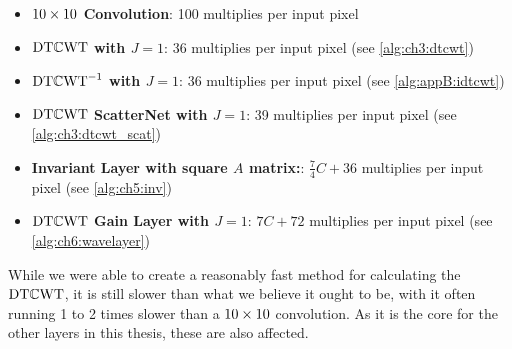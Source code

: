 \pagebreak
\begin{itemize}
  \item \textbf{$10\times10$ Convolution}: 100 multiplies per input pixel
  \item \textbf{$\mathrm{DT}\mathbb{C}\mathrm{WT}$ with $J=1$}: 36 multiplies per input pixel (see \autoref{alg:ch3:dtcwt})
  \item \textbf{$\mathrm{DT}\mathbb{C}\mathrm{WT}^{-1}$ with $J=1$}: 36 multiplies per input pixel (see \autoref{alg:appB:idtcwt}) 
  \item \textbf{$\mathrm{DT}\mathbb{C}\mathrm{WT}$ ScatterNet with $J=1$}: 39 multiplies per input pixel (see \autoref{alg:ch3:dtcwt_scat})
  \item \textbf{Invariant Layer with square $A$ matrix:}: $\frac{7}{4}C + 36$ multiplies per input pixel (see \autoref{alg:ch5:inv})
  \item \textbf{$\mathrm{DT}\mathbb{C}\mathrm{WT}$ Gain Layer with $J=1$}: $7C + 72$ multiplies per input pixel  (see \autoref{alg:ch6:wavelayer})
\end{itemize}

While we were able to create a reasonably fast method for calculating the $\mathrm{DT}\mathbb{C}\mathrm{WT}$, it is
still slower than what we believe it ought to be, with it often running 1 to 2 times
slower than a $10\times 10$ convolution. As it is the core for the other layers in
this thesis, these are also affected.

